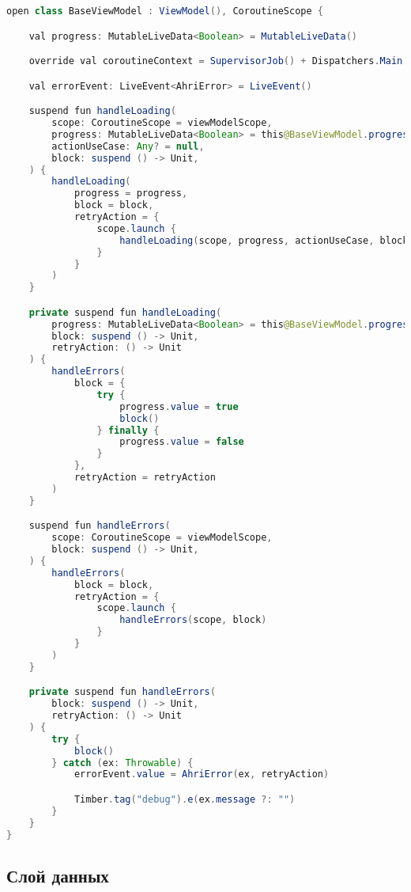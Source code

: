 \begin{lstlisting}[language=Java,label={lst:baseViewModel},caption={Компонент BaseViewModel}]
open class BaseViewModel : ViewModel(), CoroutineScope {

    val progress: MutableLiveData<Boolean> = MutableLiveData()

    override val coroutineContext = SupervisorJob() + Dispatchers.Main

    val errorEvent: LiveEvent<AhriError> = LiveEvent()

    suspend fun handleLoading(
        scope: CoroutineScope = viewModelScope,
        progress: MutableLiveData<Boolean> = this@BaseViewModel.progress,
        actionUseCase: Any? = null,
        block: suspend () -> Unit,
    ) {
        handleLoading(
            progress = progress,
            block = block,
            retryAction = {
                scope.launch {
                    handleLoading(scope, progress, actionUseCase, block)
                }
            }
        )
    }

    private suspend fun handleLoading(
        progress: MutableLiveData<Boolean> = this@BaseViewModel.progress,
        block: suspend () -> Unit,
        retryAction: () -> Unit
    ) {
        handleErrors(
            block = {
                try {
                    progress.value = true
                    block()
                } finally {
                    progress.value = false
                }
            },
            retryAction = retryAction
        )
    }

    suspend fun handleErrors(
        scope: CoroutineScope = viewModelScope,
        block: suspend () -> Unit,
    ) {
        handleErrors(
            block = block,
            retryAction = {
                scope.launch {
                    handleErrors(scope, block)
                }
            }
        )
    }

    private suspend fun handleErrors(
        block: suspend () -> Unit,
        retryAction: () -> Unit
    ) {
        try {
            block()
        } catch (ex: Throwable) {
            errorEvent.value = AhriError(ex, retryAction)

            Timber.tag("debug").e(ex.message ?: "")
        }
    }
}
\end{lstlisting}

\subsection{Слой данных}

